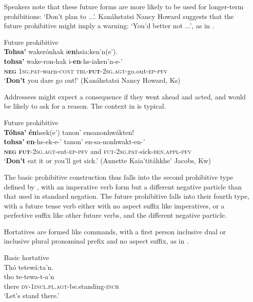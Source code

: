 \documentclass[output=paper,colorlinks,citecolor=brown]{langscibook}
\begin{document}
Speakers note that these future forms are more likely to be used for longer-term prohibitions: ‘Don’t plan to ...’. Kanáhstatsi Nancy Howard suggests that the future prohibitive might imply a warning: ‘You’d better not ...’, as in . 

\ea\label{ex:moh:30} Future prohibitive\\
    \glll \textbf{Tohsa’} wakerónhak i\textbf{en}hsia:ken’n(e’). \\
         \textbf{tohsa’} wake-ron-hak i-\textbf{en}-hs-iaken’n-e-’\\
         \textbf{\textsc{neg}} \textsc{1sg.pat}-warn-\textsc{cont} \textsc{trl-}\textbf{\textsc{fut}}\textsc{-2sg.agt}-go.out-\textsc{ep-pfv}\\
    \glt ‘\textbf{Don’t} you dare go out!’ (Kanáhstatsi Nancy Howard, Ks)
\z

Addressees might expect a consequence if they went ahead and acted, and would be likely to ask for a reason. The context in  is typical.

\ea\label{ex:moh:31}Future prohibitive\\
    \glll \textbf{Tóhsa’} \textbf{én}hsek(e’)  tanon’ ensanonhwákten! \\
         \textbf{tohsa’} \textbf{en}-hs-ek-e-’ tanon’ en-sa-nonhwakt-en-’\\
         \textbf{\textsc{neg}} \textbf{\textsc{fut}}\textsc{-2sg.agt}-eat-\textsc{ep-pfv} and \textsc{fut-2sg.pat}-sick-\textsc{ben.appl-pfv}\\
    \glt ‘\textbf{Don’t} eat it or you’ll get sick.’ (Annette Kaia’titáhkhe’ Jacobs, Kw)
\z

The basic prohibitive construction thus falls into the second prohibitive type defined by \citet{AuweraEtAl2013}, with an imperative verb form but a different negative particle than that used in standard negation. The future prohibitive falls into their fourth type, with a future tense verb either with no aspect suffix like imperatives, or a perfective suffix like other future verbs, and the different negative particle. 

Hortatives are formed like commands, with a first person inclusive dual or inclusive plural pronominal prefix and no aspect suffix, as in .

\ea\label{ex:moh:32}Basic hortative\\
    \glll Thó tetewá:ta’n. \\
         tho te-tewa-t-a’n \\
         there \textsc{dv-1incl.pl.agt}-be.standing-\textsc{inch}\\
    \glt ‘Let’s stand there.’
\z
\end{document}

